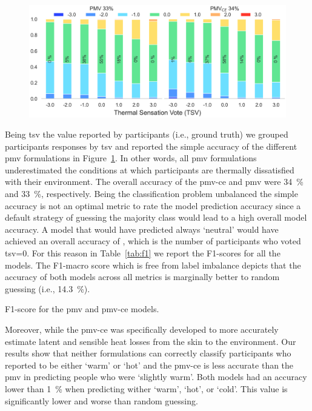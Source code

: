 \begin{figure}[htb!]
    \centering
    \includegraphics[width=\textwidth]{figures/bar_stacked_model_accuracy}
    \caption{}
    \label{fig:bar_stacked_model_accuracy}
\end{figure}

Being \ac{tsv} the value reported by participants (i.e., ground truth) we grouped participants responses by \ac{tsv} and reported the simple accuracy of the different \ac{pmv} formulations in Figure~\ref{fig:bar_stacked_model_accuracy}.
In other words, all \ac{pmv} formulations underestimated the conditions at which participants are thermally dissatisfied with their environment.
The overall accuracy of the \gls{pmv-ce} and \ac{pmv} were \qty{34}{\percent} and \qty{33}{\percent}, respectively.
Being the classification problem unbalanced the simple accuracy is not an optimal metric to rate the model prediction accuracy since a default strategy of guessing the majority class would lead to a high overall model accuracy.
A model that would have predicted always `neutral' would have achieved an overall accuracy of , which is the number of participants who voted \ac{tsv}=0.
For this reason in Table~\ref{tab:f1} we report the F1-scores for all the models.
The F1-macro score which is free from label imbalance depicts that the accuracy of both models across all metrics is marginally better to random guessing (i.e., \qty{14.3}{\percent}).

\begin{table}[htb!]
    \centering
    
    \caption{F1-score for the \ac{pmv} and \gls{pmv-ce} models.}
    \label{tab:f1}
\end{table}

Moreover, while the \gls{pmv-ce} was specifically developed to more accurately estimate latent and sensible heat losses from the skin to the environment.
Our results show that neither formulations can correctly classify participants who reported to be either `warm' or `hot' and the \gls{pmv-ce} is less accurate than the \ac{pmv} in predicting people who were `slightly warm'.
Both models had an accuracy lower than \qty{1}{\percent} when predicting wither `warm', `hot', or `cold'.
This value is significantly lower and worse than random guessing.

